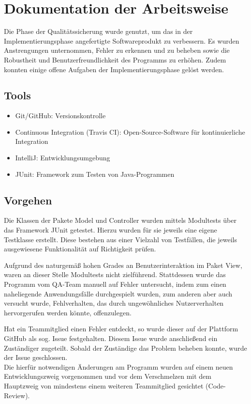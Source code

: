 \section{Dokumentation der Arbeitsweise}

Die Phase der Qualitätssicherung wurde genutzt, um das in der Implementierungsphase angefertigte Softwareprodukt zu verbessern. Es wurden Anstrengungen unternommen, Fehler zu erkennen und zu beheben sowie die Robustheit und Benutzerfreundlichkeit des Programms zu erhöhen.
Zudem konnten einige offene Aufgaben der Implementierungsphase gelöst werden.

\subsection{Tools}

\begin{itemize}
\item Git/GitHub: Versionskontrolle
\item Continuous Integration (Travis CI): Open-Source-Software für kontinuierliche Integration
\item IntelliJ: Entwicklungsumgebung
\item JUnit: Framework zum Testen von Java-Programmen
\end{itemize}

\subsection{Vorgehen}

Die Klassen der Pakete Model und Controller wurden mittels Modultests über das Framework JUnit getestet. Hierzu wurden für sie jeweils eine eigene Testklasse erstellt. Diese bestehen aus einer Vielzahl von Testfällen, die jeweils ausgewiesene Funktionalität auf Richtigkeit prüfen.

Aufgrund des naturgemäß hohen Grades an Benutzerinteraktion im Paket View, waren an dieser Stelle Modultests nicht zielführend. Stattdessen wurde das Programm vom QA-Team manuell auf Fehler untersucht, indem zum einen naheliegende Anwendungsfälle durchgespielt wurden, zum anderen aber auch versucht wurde, Fehlverhalten, das durch ungewöhnliches Nutzerverhalten hervorgerufen werden könnte, offenzulegen.

Hat ein Teammitglied einen Fehler entdeckt, so wurde dieser auf der Plattform GitHub als sog. Issue festgehalten. Diesem Issue wurde anschließend ein Zuständiger zugeteilt. Sobald der Zuständige das Problem beheben konnte, wurde der Issue geschlossen.\\
Die hierfür notwendigen Änderungen am Programm wurden auf einem neuen Entwicklungszweig vorgenommen und vor dem Verschmelzen mit dem Hauptzweig von mindestens einem weiteren Teammitglied gesichtet (Code-Review).

